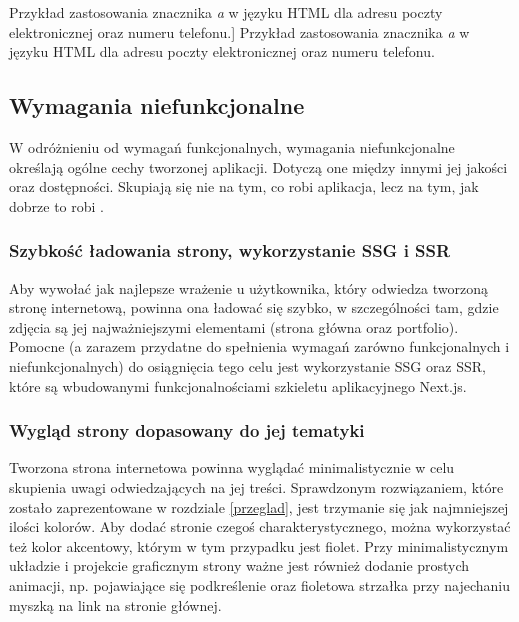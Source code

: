 \documentclass[12pt]{article}
\numberwithin{figure}{section}
\begin{document}
\begin{sloppypar}
\begin{code}[htbp]
    \vspace{0.5cm}
    
    \caption
    [Przykład zastosowania znacznika \textit{a} w języku HTML dla adresu poczty elektronicznej oraz numeru telefonu.]
    {Przykład zastosowania znacznika \textit{a} w języku HTML dla adresu poczty elektronicznej oraz numeru telefonu.}
    \label{chapter4:anchor}
\end{code}



\subsection{Wymagania niefunkcjonalne}

W odróżnieniu od wymagań funkcjonalnych, wymagania niefunkcjonalne określają ogólne cechy tworzonej aplikacji. Dotyczą one między innymi jej jakości oraz dostępności. Skupiają się nie na tym, co robi aplikacja, lecz na tym, jak dobrze to robi \cite{wymagania}. 

\subsubsection*{Szybkość ładowania strony, wykorzystanie SSG i SSR}

Aby wywołać jak najlepsze wrażenie u użytkownika, który odwiedza tworzoną stronę internetową, powinna ona ładować się szybko, w szczególności tam, gdzie zdjęcia są jej najważniejszymi elementami (strona główna oraz portfolio). Pomocne (a zarazem przydatne do spełnienia wymagań zarówno funkcjonalnych i niefunkcjonalnych) do osiągnięcia tego celu jest wykorzystanie SSG oraz SSR, które są wbudowanymi funkcjonalnościami szkieletu aplikacyjnego Next.js. 

\subsubsection*{Wygląd strony dopasowany do jej tematyki}

Tworzona strona internetowa powinna wyglądać minimalistycznie w celu skupienia uwagi odwiedzających na jej treści. Sprawdzonym rozwiązaniem, które zostało zaprezentowane w rozdziale \ref{przeglad}, jest trzymanie się jak najmniejszej ilości kolorów. Aby dodać stronie czegoś charakterystycznego, można wykorzystać też kolor akcentowy, którym w tym przypadku jest fiolet. Przy minimalistycznym układzie i projekcie graficznym strony ważne jest również dodanie prostych animacji, np. pojawiające się podkreślenie oraz fioletowa strzałka przy najechaniu myszką na link na stronie głównej. 


\end{sloppypar}
\end{document}
